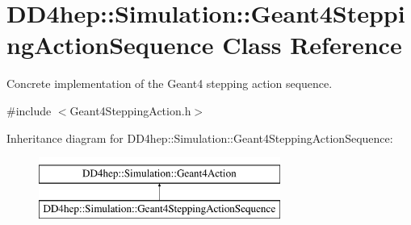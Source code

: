 \hypertarget{class_d_d4hep_1_1_simulation_1_1_geant4_stepping_action_sequence}{}\section{D\+D4hep\+:\+:Simulation\+:\+:Geant4\+Stepping\+Action\+Sequence Class Reference}
\label{class_d_d4hep_1_1_simulation_1_1_geant4_stepping_action_sequence}


Concrete implementation of the Geant4 stepping action sequence.  




{\ttfamily \#include $<$Geant4\+Stepping\+Action.\+h$>$}

Inheritance diagram for D\+D4hep\+:\+:Simulation\+:\+:Geant4\+Stepping\+Action\+Sequence\+:\begin{figure}[H]
\begin{center}
\leavevmode
\includegraphics[height=2.000000cm]{class_d_d4hep_1_1_simulation_1_1_geant4_stepping_action_sequence}
\end{center}
\end{figure}
